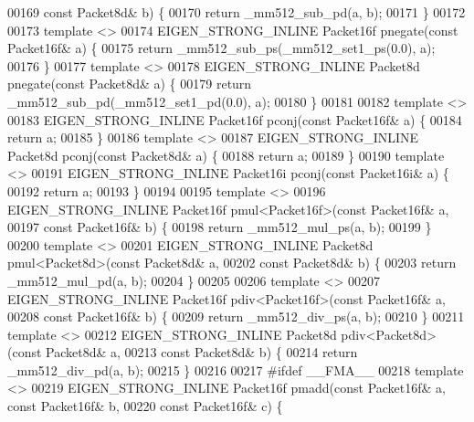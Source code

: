 \begin{DoxyCode}
00169                                             \textcolor{keyword}{const} Packet8d& b) \{
00170   \textcolor{keywordflow}{return} \_mm512\_sub\_pd(a, b);
00171 \}
00172 
00173 \textcolor{keyword}{template} <>
00174 EIGEN\_STRONG\_INLINE Packet16f pnegate(\textcolor{keyword}{const} Packet16f& a) \{
00175   \textcolor{keywordflow}{return} \_mm512\_sub\_ps(\_mm512\_set1\_ps(0.0), a);
00176 \}
00177 \textcolor{keyword}{template} <>
00178 EIGEN\_STRONG\_INLINE Packet8d pnegate(\textcolor{keyword}{const} Packet8d& a) \{
00179   \textcolor{keywordflow}{return} \_mm512\_sub\_pd(\_mm512\_set1\_pd(0.0), a);
00180 \}
00181 
00182 \textcolor{keyword}{template} <>
00183 EIGEN\_STRONG\_INLINE Packet16f pconj(\textcolor{keyword}{const} Packet16f& a) \{
00184   \textcolor{keywordflow}{return} a;
00185 \}
00186 \textcolor{keyword}{template} <>
00187 EIGEN\_STRONG\_INLINE Packet8d pconj(\textcolor{keyword}{const} Packet8d& a) \{
00188   \textcolor{keywordflow}{return} a;
00189 \}
00190 \textcolor{keyword}{template} <>
00191 EIGEN\_STRONG\_INLINE Packet16i pconj(\textcolor{keyword}{const} Packet16i& a) \{
00192   \textcolor{keywordflow}{return} a;
00193 \}
00194 
00195 \textcolor{keyword}{template} <>
00196 EIGEN\_STRONG\_INLINE Packet16f pmul<Packet16f>(\textcolor{keyword}{const} Packet16f& a,
00197                                               \textcolor{keyword}{const} Packet16f& b) \{
00198   \textcolor{keywordflow}{return} \_mm512\_mul\_ps(a, b);
00199 \}
00200 \textcolor{keyword}{template} <>
00201 EIGEN\_STRONG\_INLINE Packet8d pmul<Packet8d>(\textcolor{keyword}{const} Packet8d& a,
00202                                             \textcolor{keyword}{const} Packet8d& b) \{
00203   \textcolor{keywordflow}{return} \_mm512\_mul\_pd(a, b);
00204 \}
00205 
00206 \textcolor{keyword}{template} <>
00207 EIGEN\_STRONG\_INLINE Packet16f pdiv<Packet16f>(\textcolor{keyword}{const} Packet16f& a,
00208                                               \textcolor{keyword}{const} Packet16f& b) \{
00209   \textcolor{keywordflow}{return} \_mm512\_div\_ps(a, b);
00210 \}
00211 \textcolor{keyword}{template} <>
00212 EIGEN\_STRONG\_INLINE Packet8d pdiv<Packet8d>(\textcolor{keyword}{const} Packet8d& a,
00213                                             \textcolor{keyword}{const} Packet8d& b) \{
00214   \textcolor{keywordflow}{return} \_mm512\_div\_pd(a, b);
00215 \}
00216 
00217 \textcolor{preprocessor}{#ifdef \_\_FMA\_\_}
00218 \textcolor{keyword}{template} <>
00219 EIGEN\_STRONG\_INLINE Packet16f pmadd(\textcolor{keyword}{const} Packet16f& a, \textcolor{keyword}{const} Packet16f& b,
00220                                     \textcolor{keyword}{const} Packet16f& c) \{

\end{DoxyCode}
